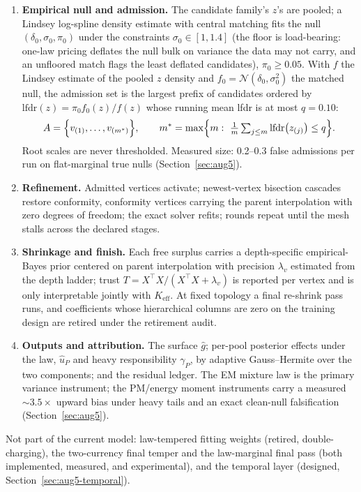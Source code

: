 \documentclass[11pt]{article}
\begin{document}
\begin{enumerate}[leftmargin=2em,itemsep=3pt]
\item \textbf{Empirical null and admission.} The candidate family's $z$'s are
pooled; a Lindsey log-spline density estimate with central matching fits the
null $(\delta_0,\sigma_0,\pi_0)$ under the constraints $\sigma_0\in[1,1.4]$
(the floor is load-bearing: one-law pricing deflates the null bulk on
variance the data may not carry, and an unfloored match flags the least
deflated candidates), $\pi_0\ge 0.05$. With $f$ the Lindsey estimate of the pooled $z$ density and
$f_0=\mathcal{N}(\delta_0,\sigma_0^2)$ the matched null, the admission set is
the largest prefix of candidates ordered by
$\mathrm{lfdr}(z)=\pi_0 f_0(z)/f(z)$ whose running mean lfdr is at most
$q=0.10$:
\[
A=\Bigl\{v_{(1)},\dots,v_{(m^*)}\Bigr\},\qquad
m^*=\max\Bigl\{m:\ \tfrac1m\textstyle\sum_{j\le m}
\mathrm{lfdr}\bigl(z_{(j)}\bigr)\le q\Bigr\}.
\] Root scales are never thresholded. Measured size: 0.2--0.3
false admissions per run on flat-marginal true nulls
(Section~\ref{sec:aug5}).

\item \textbf{Refinement.} Admitted vertices activate; newest-vertex
bisection cascades restore conformity, conformity vertices carrying the
parent interpolation with zero degrees of freedom; the exact solver refits;
rounds repeat until the mesh stalls across the declared stages.

\item \textbf{Shrinkage and finish.} Each free surplus carries a
depth-specific empirical-Bayes prior centered on parent interpolation with
precision $\lambda_v$ estimated from the depth ladder; trust
$T=X^\top X/(X^\top X+\lambda_v)$ is reported per vertex and is only
interpretable jointly with $K_{\mathrm{eff}}$. At fixed topology a final
re-shrink pass runs, and coefficients whose hierarchical columns are zero on
the training design are retired under the retirement audit.

\item \textbf{Outputs and attribution.} The surface $\hat g$; per-pool
posterior effects under the law, $\hat u_P$ and heavy responsibility
$\gamma_P$, by adaptive Gauss--Hermite over the two components; and the
residual ledger. The EM mixture law is the primary variance instrument; the
PM/energy moment instruments carry a measured $\sim3.5\times$ upward bias
under heavy tails and an exact clean-null falsification
(Section~\ref{sec:aug5}).

\end{enumerate}

Not part of the current model: law-tempered fitting weights (retired,
double-charging), the two-currency final temper and the law-marginal final
pass (both implemented, measured, and experimental), and the temporal layer
(designed, Section~\ref{sec:aug5-temporal}).
\end{document}
